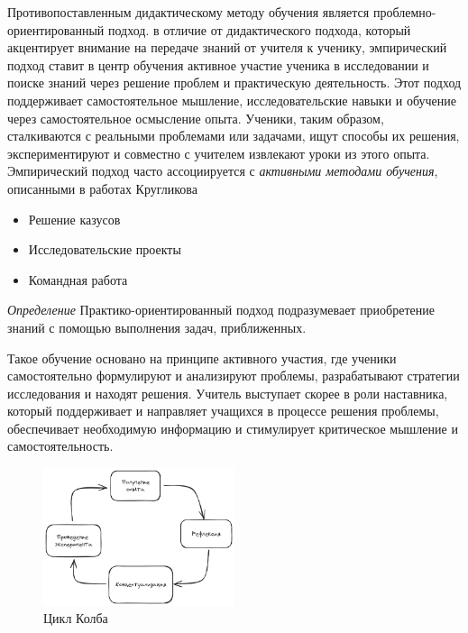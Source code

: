 Противопоставленным дидактическому методу обучения является проблемно-ориентированный подход.
в отличие от дидактического подхода, который акцентирует внимание на передаче знаний от учителя к ученику,
эмпирический подход ставит в центр обучения активное участие ученика в исследовании
и поиске знаний через решение проблем и практическую деятельность.
Этот подход поддерживает самостоятельное мышление, исследовательские навыки и обучение через самостоятельное осмысление опыта.
Ученики, таким образом, сталкиваются с реальными проблемами или задачами, 
ищут способы их решения, экспериментируют и совместно с учителем извлекают уроки из этого опыта.
Эмпирический подход часто ассоциируется с \textit{активными методами обучения}, описанными в работах Кругликова \cite{кругликов2006деловые}

\begin{itemize}
    \item Решение казусов
    \item Исследовательские проекты
    \item Командная работа
\end{itemize}

\textit{Определение} Практико-ориентированный подход подразумевает приобретение знаний
 с помощью выполнения задач, приближенных.

Такое обучение основано на принципе активного участия, где ученики самостоятельно формулируют и анализируют проблемы, 
 разрабатывают стратегии исследования и находят решения. 
 Учитель выступает скорее в роли наставника, который поддерживает 
 и направляет учащихся в процессе решения проблемы, обеспечивает необходимую информацию и
 стимулирует критическое мышление и самостоятельность.


\begin{figure}[h]
    \centering
    \includegraphics[width=0.5\textwidth]{assets/pedagogic/psy/colb.excalidraw.png}
    \caption{Цикл Колба}
    \label{colb}
\end{figure}

